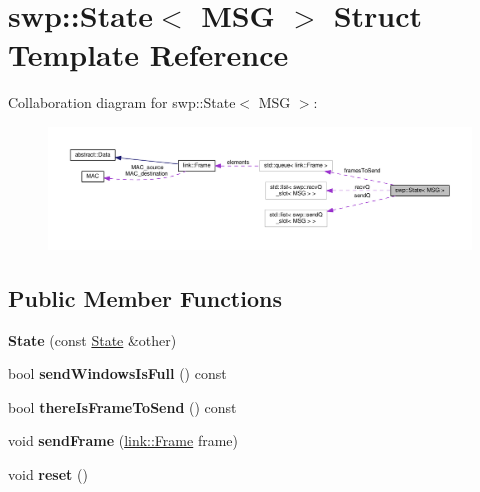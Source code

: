 \hypertarget{structswp_1_1State}{}\section{swp\+:\+:State$<$ M\+SG $>$ Struct Template Reference}
\label{structswp_1_1State}


Collaboration diagram for swp\+:\+:State$<$ M\+SG $>$\+:\nopagebreak
\begin{figure}[H]
\begin{center}
\leavevmode
\includegraphics[width=350pt]{structswp_1_1State__coll__graph}
\end{center}
\end{figure}
\subsection*{Public Member Functions}
\begin{DoxyCompactItemize}
\item 
{\bfseries State} (const \hyperlink{structswp_1_1State}{State} \&other)\hypertarget{structswp_1_1State_a2eb6824bd9f7bfa5e84b402ce3915334}{}\label{structswp_1_1State_a2eb6824bd9f7bfa5e84b402ce3915334}

\item 
bool {\bfseries send\+Windows\+Is\+Full} () const \hypertarget{structswp_1_1State_ad932ee3326683cbee09e8a8b36f26b9b}{}\label{structswp_1_1State_ad932ee3326683cbee09e8a8b36f26b9b}

\item 
bool {\bfseries there\+Is\+Frame\+To\+Send} () const \hypertarget{structswp_1_1State_a5a9c617b0cf8b06e442d10b6e3d98143}{}\label{structswp_1_1State_a5a9c617b0cf8b06e442d10b6e3d98143}

\item 
void {\bfseries send\+Frame} (\hyperlink{structlink_1_1Frame}{link\+::\+Frame} frame)\hypertarget{structswp_1_1State_adc781763914d3d1de3ff5c462f1f76ef}{}\label{structswp_1_1State_adc781763914d3d1de3ff5c462f1f76ef}

\item 
void {\bfseries reset} ()\hypertarget{structswp_1_1State_a02c83f258bba472f268c119768147def}{}\label{structswp_1_1State_a02c83f258bba472f268c119768147def}

\end{DoxyCompactItemize}
